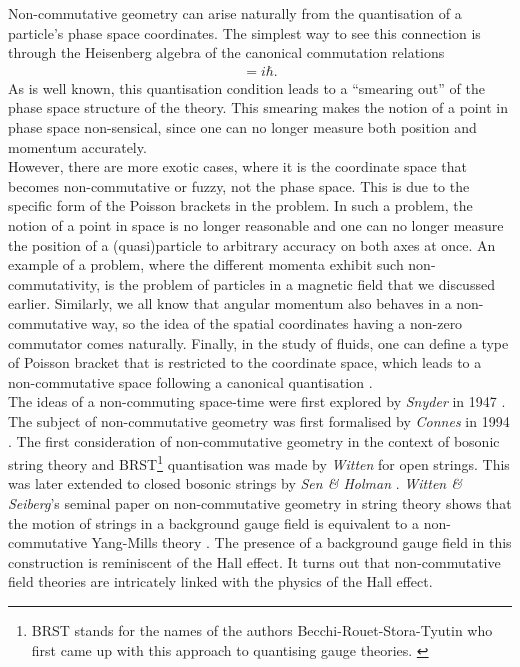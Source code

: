     Non-commutative geometry can arise naturally from the quantisation of a particle's phase space coordinates. The simplest way to see this connection is through the Heisenberg algebra of the canonical commutation relations
    \begin{align}
        [\hat{x}, \hat{p}] = i \hbar.
    \end{align}
    As is well known, this quantisation condition leads to a ``smearing out'' of the phase space structure of the theory. This smearing makes the notion of a point in phase space non-sensical, since one can no longer measure both position and momentum accurately. \\
    \indent However, there are more exotic cases, where it is the coordinate space that becomes non-commutative or fuzzy, not the phase space. This is due to the specific form of the Poisson brackets in the problem. In such a problem, the notion of a point in space is no longer reasonable and one can no longer measure the position of a (quasi)particle to arbitrary accuracy on both axes at once. An example of a problem, where the different momenta exhibit such non-commutativity, is the problem of particles in a magnetic field that we discussed earlier. Similarly, we all know that angular momentum also behaves in a non-commutative way, so the idea of the spatial coordinates having a non-zero commutator comes naturally. Finally, in the study of fluids, one can define a type of Poisson bracket that is restricted to the coordinate space, which leads to a non-commutative space following a canonical quantisation \cite{Jackiw:2002pn}. \\
    \indent The ideas of a non-commuting space-time were first explored by \textit{Snyder} in 1947 \cite{Snyder:1946qz, Snyder:1947nq}. The subject of non-commutative geometry was first formalised by \textit{Connes} in 1994 \cite{Connes:1994yd}. The first consideration of non-commutative geometry in the context of bosonic string theory and BRST\footnote{BRST stands for the names of the authors Becchi-Rouet-Stora-Tyutin who first came up with this approach to quantising gauge theories. \cite{Tyutin:1975qk, Becchi:1974xu, Becchi:1975nq}  } quantisation was made by \textit{Witten} \cite{Witten:1985cc} for open strings. This was later extended to closed bosonic strings by \textit{Sen \& Holman}  \cite{Sen:1986bh}. \textit{Witten \& Seiberg}'s seminal paper on non-commutative geometry in string theory shows that the motion of strings in a background gauge field is equivalent to a non-commutative Yang-Mills theory \cite{Seiberg:1999vs}. The presence of a background gauge field in this construction is reminiscent of the Hall effect. It turns out that non-commutative field theories are intricately linked with the physics of the Hall effect. \\
